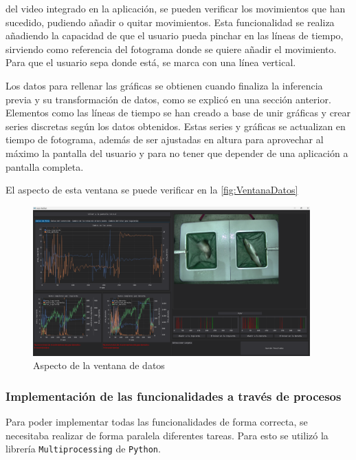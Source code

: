\begin{itemize}
\begin{itemize}
        del video integrado en la aplicación, se pueden verificar los movimientos que han sucedido, pudiendo añadir o quitar movimientos.\newline
        Esta funcionalidad se realiza añadiendo la capacidad de que el usuario pueda pinchar en las líneas de tiempo, sirviendo como referencia del fotograma donde se quiere añadir el movimiento. Para que el usuario sepa donde está, se 
        marca con una línea vertical.
    \end{itemize}
    Los datos para rellenar las gráficas se obtienen cuando finaliza la inferencia previa y su transformación de datos, como se explicó en una sección anterior.\newline
    Elementos como las líneas de tiempo se han creado a base de unir gráficas y crear series discretas según los datos obtenidos. Estas series y gráficas se actualizan en tiempo de fotograma, además de ser ajustadas en altura 
    para aprovechar al máximo la pantalla del usuario y para no tener que depender de una aplicación a pantalla completa.

    El aspecto de esta ventana se puede verificar en la \autoref{fig:VentanaDatos}

    \begin{figure}[H]
        \centering
        \includegraphics[width=0.95\textwidth]{images/6/6.5/VentanaDatos.png}
        \caption{Aspecto de la ventana de datos}
        \label{fig:VentanaDatos}
    \end{figure}
\end{itemize}
\clearpage
\subsubsection{Implementación de las funcionalidades a través de procesos}

Para poder implementar todas las funcionalidades de forma correcta, se necesitaba realizar de forma paralela diferentes tareas. Para esto se utilizó la librería \texttt{Multiprocessing} de \texttt{Python}.

